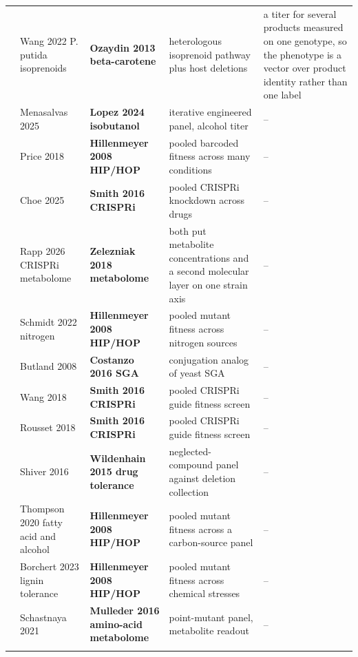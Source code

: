 \begin{landscape}
\begin{longtable}{@{}r@{\hspace{4pt}} L{40mm} L{40mm} L{74mm} L{74mm}@{}}
 & Wang 2022 P. putida isoprenoids  & \textbf{Ozaydin 2013 beta-carotene} & heterologous isoprenoid pathway plus host deletions & a titer for several products measured on one genotype, so the phenotype is a vector over product identity rather than one label \\
 & Menasalvas 2025  & \textbf{Lopez 2024 isobutanol} & iterative engineered panel, alcohol titer & -- \\
 & Price 2018  & \textbf{Hillenmeyer 2008 HIP/HOP} & pooled barcoded fitness across many conditions & -- \\
 & Choe 2025  & \textbf{Smith 2016 CRISPRi} & pooled CRISPRi knockdown across drugs & -- \\
 & Rapp 2026 CRISPRi metabolome  & \textbf{Zelezniak 2018 metabolome} & both put metabolite concentrations and a second molecular layer on one strain axis & -- \\
 & Schmidt 2022 nitrogen  & \textbf{Hillenmeyer 2008 HIP/HOP} & pooled mutant fitness across nitrogen sources & -- \\
 & Butland 2008  & \textbf{Costanzo 2016 SGA} & conjugation analog of yeast SGA & -- \\
 & Wang 2018  & \textbf{Smith 2016 CRISPRi} & pooled CRISPRi guide fitness screen & -- \\
 & Rousset 2018  & \textbf{Smith 2016 CRISPRi} & pooled CRISPRi guide fitness screen & -- \\
 & Shiver 2016  & \textbf{Wildenhain 2015 drug tolerance} & neglected-compound panel against deletion collection & -- \\
 & Thompson 2020 fatty acid and alcohol  & \textbf{Hillenmeyer 2008 HIP/HOP} & pooled mutant fitness across a carbon-source panel & -- \\
 & Borchert 2023 lignin tolerance  & \textbf{Hillenmeyer 2008 HIP/HOP} & pooled mutant fitness across chemical stresses & -- \\
 & Schastnaya 2021  & \textbf{Mulleder 2016 amino-acid metabolome} & point-mutant panel, metabolite readout & -- \\
\addlinespace[5pt]

\end{longtable}
\end{landscape}
